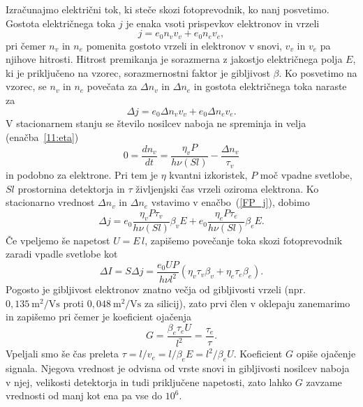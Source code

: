 Izračunajmo električni tok, ki steče skozi fotoprevodnik, ko nanj posvetimo. 
Gostota električnega toka $j$ je enaka vsoti prispevkov elektronov  in vrzeli
\begin{equation}
j = e_0 n_v v_v + e_0 n_e v_e,
\end{equation}
pri čemer $n_v$ in $n_e$ pomenita gostoto vrzeli in elektronov v snovi, $v_v$ in $v_e$ pa 
njihove hitrosti. Hitrost premikanja 
je sorazmerna z jakostjo električnega polja $E$, ki je priključeno
 na vzorec, sorazmernostni faktor je gibljivost $\beta$. Ko posvetimo na vzorec, 
 se $n_v$ in $n_e$ povečata za $\Delta n_v$ in $\Delta n_e$ in
gostota električnega toka naraste za
\begin{equation}
\Delta j = e_0 \Delta n_v v_v + e_0 \Delta n_e v_e.
\label{FP_j}
\end{equation}
V stacionarnem stanju se število nosilcev naboja ne spreminja in velja (enačba~\ref{11:eta})
\begin{equation}
0 = \frac{dn_v}{dt} = \frac{\eta_v P}{h \nu (Sl)} - \frac{\Delta n_v}{\tau_v}
\end{equation}
in podobno za elektrone. Pri tem je $\eta$ kvantni izkoristek,
$P$ moč vpadne svetlobe,
$Sl$ prostornina detektorja in $\tau$ življenjski čas vrzeli oziroma elektrona. 
Ko stacionarno vrednost $\Delta n_v$ in $\Delta n_e$ vstavimo v enačbo~(\ref{FP_j}), dobimo
\begin{equation}
\Delta j = e_0 \frac{\eta_v P \tau_v}{h \nu (Sl)} \beta_v  E + 
e_0 \frac{\eta_e P \tau_e}{h \nu (Sl)} \beta_e  E.
\end{equation}
Če vpeljemo še napetost $U = E\,l$, zapišemo povečanje toka skozi fotoprevodnik zaradi 
vpadle svetlobe kot
\begin{equation}
\Delta I = S\Delta j = \frac{e_0 U P }{h \nu l^2} \left(\eta_v \tau_v \beta_v + 
\eta_e \tau_e \beta_e \right).
\end{equation}
Pogosto je gibljivost elektronov znatno večja od gibljivosti vrzeli (npr.
$0,135~\si{\meter}^2/\si{\volt\second}$ proti $0,048~\si{\meter}^2/\si{\volt\second}$ za silicij), 
 zato prvi člen v oklepaju zanemarimo in zapišemo
pri čemer je koeficient ojačenja 
\begin{equation}
G = \frac{\beta_e \tau_e U}{l^2} = \frac{\tau_e}{\tau}.
\end{equation}
Vpeljali smo še čas preleta $\tau = l/v_e = l/\beta_e E = l^2/\beta_e U$.
\newpage
Koeficient $G$ opiše ojačenje signala. Njegova vrednost je odvisna od 
vrste snovi in gibljivosti nosilcev naboja v njej, velikosti
detektorja in tudi priključene napetosti, zato lahko $G$ zavzame vrednosti od manj kot ena pa
vse do $10^6$. 

